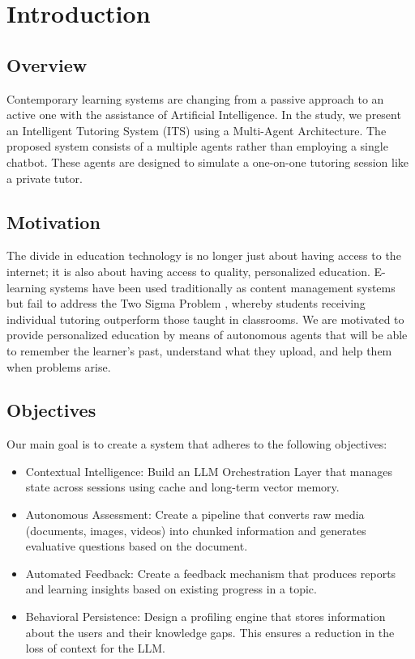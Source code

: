 \chapter{Introduction}

\section{Overview}
Contemporary learning systems are changing from a passive approach to an active one with the assistance of Artificial Intelligence. In the study, we present an Intelligent Tutoring System (ITS) using a Multi-Agent Architecture. The proposed system consists of a multiple agents rather than employing a single chatbot. These agents are designed to simulate a one-on-one tutoring session like a private tutor.

\section{Motivation}
The divide in education technology is no longer just about having access to the internet; it is also about having access to quality, personalized education. E-learning systems have been used traditionally as content management systems but fail to address the Two Sigma Problem \cite{bloom1984}, whereby students receiving individual tutoring outperform those taught in classrooms. We are motivated to provide personalized education by means of autonomous agents that will be able to remember the learner’s past, understand what they upload, and help them when problems arise.

\section{Objectives}
Our main goal is to create a system that adheres to the following objectives:
\begin{itemize}
	\item Contextual Intelligence: Build an LLM Orchestration Layer that manages state across sessions using cache and long-term vector memory.
	\item Autonomous Assessment: Create a pipeline that converts raw media (documents, images, videos) into chunked information and generates evaluative questions based on the document.
	\item Automated Feedback: Create a feedback mechanism that produces reports and learning insights based on existing progress in a topic.
	\item Behavioral Persistence: Design a profiling engine that stores information about the users and their knowledge gaps. This ensures a reduction in the loss of context for the LLM.
\end{itemize}

